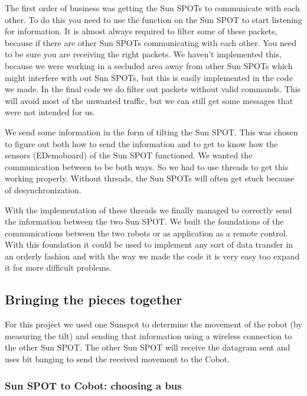 \documentclass[a4paper,10pt]{article} %
\begin{document}
The first order of business was getting the Sun SPOTs to communicate with each
other. To do this you need to use the function on the Sun SPOT to start
listening for information. It is almost always required to filter some of these
packets, because if there are other Sun SPOTs communicating with each other.
You need to be sure you are receiving the right packets. We haven't implemented
this, because we were working in a secluded area away from other Sun SPOTs which
might interfere with out Sun SPOTs, but this is easily implemented in the code
we made. In the final code we do filter out packets without valid commands.
This will avoid most of the unwanted traffic, but we can still get some messages
that were not intended for us.

We send some information in the form of tilting the Sun SPOT. This was chosen
to figure out both how to send the information and to get to know how the
sensors (EDemoboard) of the Sun SPOT functioned. We wanted the communication
between to be both ways. So we had to use threads to get this working properly.
Without threads, the Sun SPOTs will often get stuck because of desynchronization.

With the implementation of these threads we finally managed to correctly send
the information between the two Sun SPOT. We built the foundations of the
communications between the two robots or as application as a remote control.
With this foundation it could be used to implement any sort of data transfer in
an orderly fashion and with the way we made the code it is very easy too expand
it for more difficult problems.



\subsection{Bringing the pieces together} %
\label{subsec:Bringing the pieces together}

For this project we used one Sunspot to determine the movement of the robot (by
measuring the tilt) and sending that information using a wireless connection to
the other Sun SPOT. The other Sun SPOT will receive the datagram sent and uses
bit banging to send the received movement to the Cobot.

\subsubsection{Sun SPOT to Cobot: choosing a bus} %
\label{ssub:bitbang}
\end{document}

